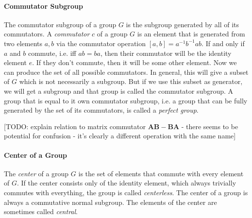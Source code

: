 

\paragraph{Commutator Subgroup} The commutator subgroup of a group $G$ is the subgroup generated by all of its commutators. A \emph{commutator} $c$ of a group $G$ is an element that is generated from two elements $a,b$ via the commutator operation $[a,b] = a^{-1} b^{-1} a b$. If and only if $a$ and $b$ commute, i.e. iff $ab = ba$, then their commutator will be the identity element $e$. If they don't commute, then it will be some other element. Now we can produce the set of all possible commutators. In general, this will give a subset of $G$ which is not necessarily a subgroup. But if we use this subset as generator, we will get a subgroup and that group is called the commutator subgroup. A group that is equal to it own commutator subgroup, i.e. a group that can be fully generated by the set of its commutators, is called a \emph{perfect group}.


[TODO: explain relation to matrix commutator $\mathbf{AB - BA}$ - there seems to be potential for confusion - it's clearly a different operation with the same name]




\paragraph{Center of a Group}
The \emph{center} of a group $G$ is the set of elements that commute with every element of $G$. If the center consists only of the identity element, which always trivially commutes with everything, the group is called \emph{centerless}. The center of a group is always a commutative normal subgroup. The elements of the center are sometimes called \emph{central}.


